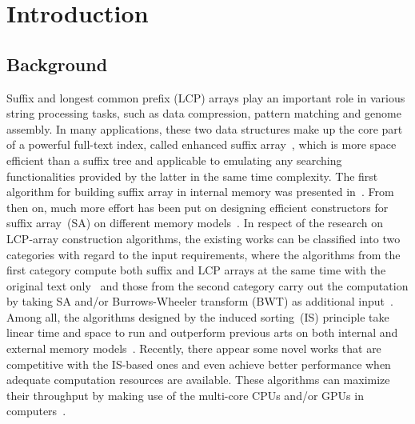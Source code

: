 \documentclass[10pt,journal,compsoc]{IEEEtran}
\begin{document}
\IEEEpeerreviewmaketitle

\section{Introduction}\label{sec:introduction}

\subsection{Background} \label{sec:introduction:background}


Suffix and longest common prefix (LCP) arrays play an important role in various string processing tasks, such as data compression, pattern matching and genome assembly. In many applications, these two data structures make up the core part of a powerful full-text index, called enhanced suffix array~\cite{Abouelhodaa2004}, which is more space efficient than a suffix tree and applicable to emulating any searching functionalities provided by the latter in the same time complexity. The first algorithm for building suffix array in internal memory was presented in~\cite{Manber1993}. From then on, much more effort has been put on designing efficient constructors for suffix array~(SA) on different memory models~\cite{Karkkainen2003, Ko2003, Kim2003, Nong11, Dementiev2008, Ferragina2012, Manzini2004, Bingmann12, Karkkainen2014, Nong14, Nong15}. In respect of the research on LCP-array construction algorithms, the existing works can be classified into two categories with regard to the input requirements, where the algorithms from the first category compute both suffix and LCP arrays at the same time with the original text only~\cite{Fischer11, Bingmann12, Flick2015} and those from the second category carry out the computation by taking SA and/or Burrows-Wheeler transform (BWT) as additional input~\cite{Kasai2001,Karkkainen2009, Fischer11, Puglisi2008, Puglisi2008, Deo2013}. Among all, the algorithms designed by the induced sorting~(IS) principle take linear time and space to run and outperform previous arts on both internal and external memory models~\cite{Nong11, Karkkainen2014}. Recently, there appear some novel works that are competitive with the IS-based ones and even achieve better performance when adequate computation resources are available. These algorithms can maximize their throughput by making use of the multi-core CPUs and/or GPUs in computers~\cite{Osipov2012, Deo2013, Wang2015, Karkkainen2015, Karkkainen2016}. 
\end{document}
